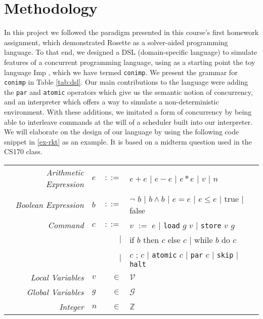 \section{Methodology}
In this project we followed the paradigm presented in this course's first homework assignment, which demonstrated Rosette as a solver-aided programming language.  To that end, we designed a DSL (domain-specific language) to simulate features of a concurrent programming language, using as a starting point the toy language Imp \citep{winskel1993}, which we have termed \texttt{conimp}. We present the grammar for \texttt{conimp} in Table \ref{tab:dsl}. Our main contributions to the language were adding the \texttt{par} and \texttt{atomic} operators which give us the semantic notion of concurrency, and an interpreter which offers a way to simulate a non-deterministic environment.  With these additions, we imitated a form of concurrency by being able to interleave commands at the will of a scheduler built into our interpreter.  We will elaborate on the design of our language by using the following code snippet in \ref{ex-rkt} as an example.  It is based on a midterm question used in the CS170 class.

\begin{table*}[!h]
\centering
\begin{tabular}{ r l r l }
\emph{Arithmetic Expression} & $e$ & $::=$ & $e + e$ 
                                         $|$ $e - e$ 
                                         $|$ $e * e$ 
                                         $|$ $v$ 
                                         $|$ $n$ \\
\emph{Boolean Expression} & $b$ & $::=$ & $\neg$ $b$ 
                                      $|$ $b \wedge b$ 
                                      $|$ $e = e$ 
                                      $|$ $e \leq e$ 
                                      $|$ true 
                                      $|$ false \\
\emph{Command} & $c$ & $::=$ & $v$ $:=$ $e$ 
							 $|$   \texttt{load} $g$ $v$
							 $|$   \texttt{store} $v$ $g$ \\ 
               &     &       $|$ & if $b$ then $c$ else $c$
                             $|$   while $b$ do $c$ \\
               &     &       $|$ & $c$ ; $c$
							 $|$   \texttt{atomic} $c$
							 $|$   \texttt{par} $c$
							 $|$   \texttt{skip}
							 $|$   \texttt{halt} 
                               \\
\emph{Local Variables} & $v$ & $\in$ & $\mathcal{V}$ \\
\emph{Global Variables} & $g$ & $\in$ & $\mathcal{G}$ \\
\emph{Integer} & $n$ & $\in$ & $\mathbb{Z}$ \\
\end{tabular}
\caption{
Concurrent Imp DSL grammar. 
}
\label{tab:dsl}
\end{table*}

